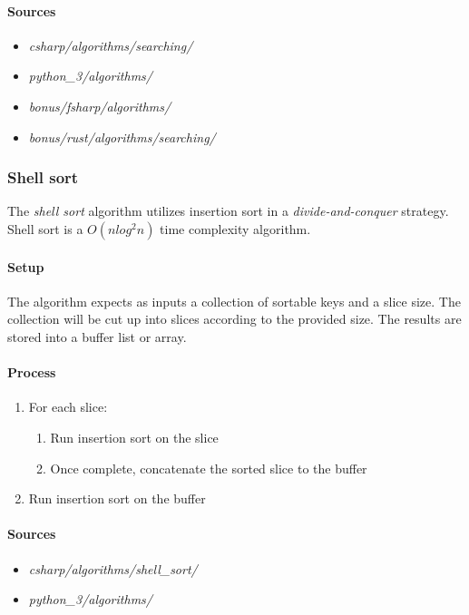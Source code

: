 \documentclass{article}
\begin{document}
\paragraph{Sources}
\begin{itemize}
\item{{\em csharp/algorithms/searching/}}
\item{{\em python\_3/algorithms/}}
\item{{\em bonus/fsharp/algorithms/}}
\item{{\em bonus/rust/algorithms/searching/}}
\end{itemize}

\subsubsection{Shell sort}
The {\em shell sort} algorithm utilizes insertion sort in a {\em divide-and-conquer} strategy.
Shell sort is a \(O(n log^2 n)\) time complexity algorithm.

\paragraph{Setup}
The algorithm expects as inputs a collection of sortable keys and a slice size. The collection will be cut up into
slices according to the provided size. The results are stored into a buffer list or array.

\paragraph{Process}
\begin{enumerate}
\item{For each slice:}
  \begin{enumerate}
  \item{Run insertion sort on the slice}
  \item{Once complete, concatenate the sorted slice to the buffer}
  \end{enumerate}
\item{Run insertion sort on the buffer}
\end{enumerate}

\paragraph{Sources}
\begin{itemize}
\item{{\em csharp/algorithms/shell\_sort/}}
\item{{\em python\_3/algorithms/}}
\end{itemize}
\end{document}
